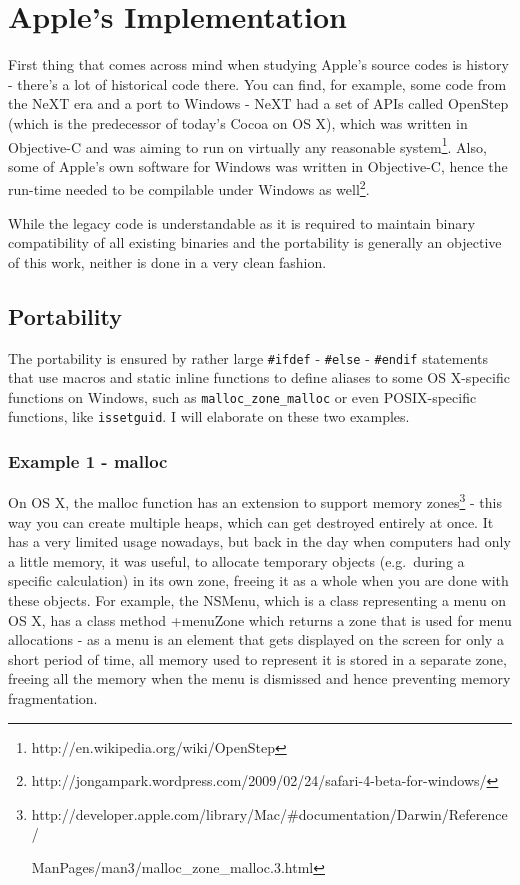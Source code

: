 \documentclass[a4paper, 11pt, fleqn]{book}
\begin{document}
\chapter{Apple's Implementation}

First thing that comes across mind when studying Apple's source codes is history - there's a lot of historical code there. You can find, for example, some code from the NeXT era and a port to Windows - NeXT had a set of APIs called OpenStep (which is the predecessor of today's Cocoa on OS X), which was written in Objective-C and was aiming to run on virtually any reasonable system\footnote{http://en.wikipedia.org/wiki/OpenStep}. Also, some of Apple's own software for Windows was written in Objective-C, hence the run-time needed to be compilable under Windows as well\footnote{http://jongampark.wordpress.com/2009/02/24/safari-4-beta-for-windows/}.

While the legacy code is understandable as it is required to maintain binary compatibility of all existing binaries and the portability is generally an objective of this work, neither is done in a very clean fashion.

\section{Portability}
The portability is ensured by rather large \verb=#ifdef= - \verb=#else= - \verb=#endif= statements that use macros and static inline functions to define aliases to some OS X-specific functions on Windows, such as \verb=malloc_zone_malloc= or even POSIX-specific functions, like \verb=issetguid=. I will elaborate on these two examples.

\subsection{Example 1 - malloc}
On OS X, the malloc function has an extension to support memory zones\footnote{http://developer.apple.com/library/Mac/#documentation/Darwin/Reference/

ManPages/man3/malloc\_zone\_malloc.3.html} - this way you can create multiple heaps, which can get destroyed entirely at once. It has a very limited usage nowadays, but back in the day when computers had only a little memory, it was useful, to allocate temporary objects (e.g.\ during a specific calculation) in its own zone, freeing it as a whole when you are done with these objects. For example, the NSMenu, which is a class representing a menu on OS X, has a class method +menuZone which returns a zone that is used for menu allocations - as a menu is an element that gets displayed on the screen for only a short period of time, all memory used to represent it is stored in a separate zone, freeing all the memory when the menu is dismissed and hence preventing memory fragmentation.
\end{document}
